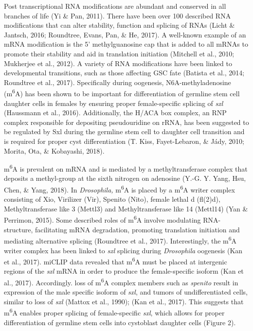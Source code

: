 \documentclass[12pt,oneside]{reedthesis}
\begin{document}
Post transcriptional RNA modifications are abundant and conserved in all
branches of life (Yi \& Pan, 2011). There have been over 100 described RNA
modifications that can alter stability, function and splicing of RNAs
(Licht \& Jantsch, 2016; Roundtree, Evans, Pan, \& He, 2017). A well-known example of an mRNA
modification is the 5' methylguanosine cap that is added to all mRNAs to
promote their stability and aid in translation initiation
(Mitchell et al., 2010; Mukherjee et al., 2012). A variety of RNA modifications have
been linked to developmental transitions, such as those affecting GSC
fate (Batista et al., 2014; Roundtree et al., 2017). Specifically during oogenesis,
N6A-methyladenosine (m\textsuperscript{6}A) has been shown to be important for
differentiation of germline stem cell daughter cells in females by
ensuring proper female-specific splicing of \emph{sxl} (Haussmann et al., 2016).
Additionally, the H/ACA box complex, an RNP complex responsible for
depositing pseudouridine on rRNA, has been suggested to be regulated by
Sxl during the germline stem cell to daughter cell transition and is
required for proper cyst differentiation (T. Kiss, Fayet-Lebaron, \& Jády, 2010; Morita, Ota, \& Kobayashi, 2018).

m\textsuperscript{6}A is prevalent on mRNA and is mediated by a methyltransferase
complex that deposits a methyl-group at the sixth nitrogen on adenosine
(Y.-G. Y. Yang, Hsu, Chen, \& Yang, 2018). In \emph{Drosophila,} m\textsuperscript{6}A is placed by a m\textsuperscript{6}A writer
complex consisting of Xio, Virilizer (Vir), Spenito (Nito), female
lethal d (fl(2)d), Methyltransferase like 3 (Mettl3) and
Methyltransferase like 14 (Mettl14) (Yan \& Perrimon, 2015). Some described roles
of m\textsuperscript{6}A involve modulating RNA-structure, facilitating mRNA
degradation, promoting translation initiation and mediating alternative
splicing (Roundtree et al., 2017). Interestingly, the m\textsuperscript{6}A writer complex
has been linked to \emph{sxl} splicing during \emph{Drosophila} oogenesis
(Kan et al., 2017). miCLIP data revealed that m\textsuperscript{6}A must be placed at
intergenic regions of the \emph{sxl} mRNA in order to produce the
female-specific isoform (Kan et al., 2017). Accordingly. loss of m\textsuperscript{6}A
complex members such as \emph{spenito} result in expression of the male
specific isoform of \emph{sxl}, and tumors of undifferentiated cells, similar
to loss of \emph{sxl} (Mattox et al., 1990); (Kan et al., 2017). This suggests that
m\textsuperscript{6}A enables proper splicing of female-specific \emph{sxl}, which allows for
proper differentiation of germline stem cells into cystoblast daughter
cells (Figure 2).
\end{document}
